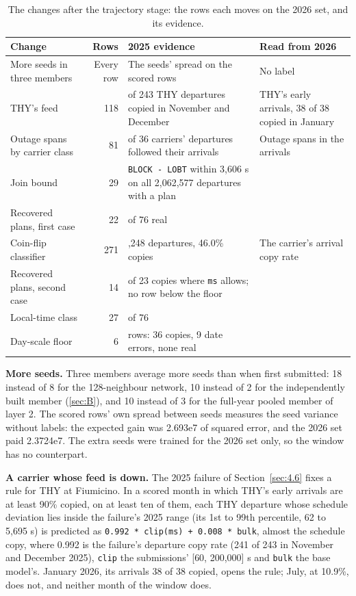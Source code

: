 \documentclass[
  manuscript=article,
  layout=preprint,
  year=2026,
  volume=x,
]{extra/joas}
\begin{document}
\begin{table}[htbp!]
  \centering
  \small
  \setlength{\tabcolsep}{5pt}\renewcommand{\arraystretch}{1.15}
  \caption{The changes after the trajectory stage: the rows each moves on the 2026 set, and its evidence.}
  \label{tab:11}
  \begin{tabularx}{\linewidth}{>{\raggedright\arraybackslash\hsize=0.9\hsize}Xr>{\raggedright\arraybackslash\hsize=1.25\hsize}X>{\raggedright\arraybackslash\hsize=0.85\hsize}X}
  \toprule
  \textbf{Change} & \textbf{Rows} & \textbf{2025 evidence} & \textbf{Read from 2026} \\
  \midrule
  More seeds in three members & Every row & The seeds' spread on the scored rows & No label \\
  THY's feed & 118 & 241 of 243 THY departures copied in November and December & THY's early arrivals, 38 of 38 copied in January \\
  Outage spans by carrier class & 81 & 25 of 36 carriers' departures followed their arrivals & Outage spans in the arrivals \\
  Join bound & 29 & \texttt{BLOCK\ -\ LOBT} within 3,606 s on all 2,062,577 departures with a plan &  \\
  Recovered plans, first case & 22 & 76 of 76 real &  \\
  Coin-flip classifier & 271 & 1,248 departures, 46.0\% copies & The carrier's arrival copy rate \\
  Recovered plans, second case & 14 & 21 of 23 copies where \texttt{ms} allows; no row below the floor &  \\
  Local-time class & 27 & 20 of 76 &  \\
  Day-scale floor & 6 & 45 rows: 36 copies, 9 date errors, none real &  \\
  \bottomrule
  \end{tabularx}
\end{table}

\textbf{More seeds.} Three members average more seeds than when first submitted: 18 instead of 8 for the 128-neighbour network, 10 instead of 2 for the independently built member (\ref{sec:B}), and 10 instead of 3 for the full-year pooled member of layer 2. The scored rows' own spread between seeds measures the seed variance without labels: the expected gain was 2.693e7 of squared error, and the 2026 set paid 2.3724e7. The extra seeds were trained for the 2026 set only, so the window has no counterpart.

\textbf{A carrier whose feed is down.} The 2025 failure of Section~\ref{sec:4.6} fixes a rule for THY at Fiumicino. In a scored month in which THY's early arrivals are at least 90\% copied, on at least ten of them, each THY departure whose schedule deviation lies inside the failure's 2025 range (its 1st to 99th percentile, 62 to 5,695 s) is predicted as \texttt{0.992\ *\ clip(ms)\ +\ 0.008\ *\ bulk}, almost the schedule copy, where 0.992 is the failure's departure copy rate (241 of 243 in November and December 2025), \texttt{clip} the submissions' {[}60, 200,000{]} s and \texttt{bulk} the base model's. January 2026, its arrivals 38 of 38 copied, opens the rule; July, at 10.9\%, does not, and neither month of the window does.
\end{document}
